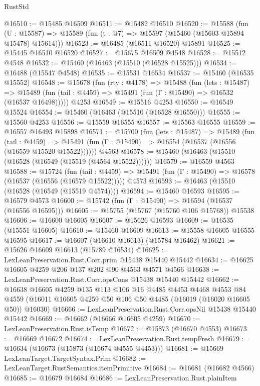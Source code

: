 \begin{lexlean}{RustStd}
\begin{coremodule}
@16510 := @15485 @16509
@16511 := @15482 @16510
@16520 := @15588
    (fun (U : @15587) => @15589 (fun (t : @7) => @15597 (@15460 (@15603 @15894 @15478) @15614)))
@16523 := @16485 (@16511 @16520) @15891
@16525 := @15445 @16510 @16520
@16527 := @15675 @16509 @4548
@16528 := @15512 @4548
@16532 := @15460 (@16463 (@15510 (@16528 @15525)))
@16534 := @16488 (@15547 @4548)
@16535 := @15531 @16534
@16537 := @15460 (@16535 @15552)
@16548 := @15678
    (fun (rty : @4178) =>
    @15488
      (fun (lets : @15487) =>
      @15489 (fun (tail : @4459) => @15491 (fun (Γ : @15490) => @16532 (@16537 @16498)))))
    @4253
@16549 := @15516 @4253
@16550 := @16549 @15524
@16554 := @15460 (@16463 (@15510 (@16528 @16550)))
@16555 := @15560 @4253
@16556 := @15559 @16555
@16557 := @15563 @16555
@16559 := @16557 @16493 @15898
@16571 := @15700
    (fun (lets : @15487) =>
    @15489
      (fun (tail : @4459) =>
      @15491 (fun (Γ : @15490) => @16554 (@16537 (@16556 (@16559 @15520 @15522))))))
    @4563
@16578 := @15460 (@16463 (@15510 (@16528 (@16549 (@15519 (@4564 @15522))))))
@16579 := @16559 @4563
@16588 := @15724
    (fun (tail : @4459) => @15491 (fun (Γ : @15490) => @16578 (@16537 (@16556 (@16579 @15522)))))
    @4573
@16593 := @16463 (@15510 (@16528 (@16549 (@15519 @4574))))
@16594 := @15460 @16593
@16595 := @16579 @4573
@16600 := @15742 (fun (Γ : @15490) => @16594 (@16537 (@16556 @16595)))
@16605 := @15755 (@15767 (@15760 @106 @15768)) @15538
@16606 := @16600 @16605
@16607 := @15626 @16593
@16609 := @16535 (@15551 @16605)
@16610 := @15460 @16609
@16613 := @15558 @16605 @16555 @16595
@16617 := @16607 (@16610 @16613) (@15784 @16462)
@16621 := @15626 @16609 @16613 (@15789 @16534)
@16625 := LexLeanPreservation.Rust.Corr.prim @15438 @15440 @15442
@16634 := @16625 @16605 @4259 @206 @137 @202 @90 @4563 @4571 @4566
@16638 := LexLeanPreservation.Rust.Corr.opsCons @15438 @15440 @15442
@16662 := @16638
    @16605
    @4259
    @135
    @113
    @106
    @16
    @4485
    @4453
    @4468
    @4553
    @84
    @4559
    (@16011 @16605 @4259 @50 @106 @50 @4485 (@16019 (@16020 @16605 @50)) @16030)
@16666 := LexLeanPreservation.Rust.Corr.opsNil @15438 @15440 @15442
@16669 := @16662 (@16666 @16605 @4259)
@16670 := LexLeanPreservation.Rust.isTemp
@16672 := @15873 (@16670 @4553)
@16673 := @16669 @16672
@16674 := LexLeanPreservation.Rust.tempFresh
@16679 := @16634 (@16673 (@15873 (@16674 @4555 @4453)))
@16681 := @15669 LexLeanTarget.TargetSyntax.Prim
@16682 := LexLeanTarget.RustSemantics.itemPrimitive
@16684 := @16681 (@16682 @4566)
@16685 := @16679 @16684
@16686 := LexLeanPreservation.Rust.plainItem

\end{coremodule}
\end{lexlean}
